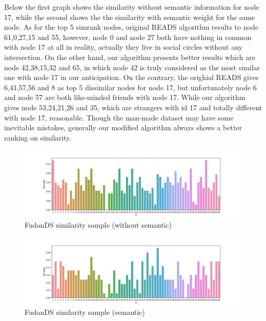 \documentclass[a4paper, 12pt]{article} %
\begin{document}
    Below the first graph shows the similarity without semantic information for node 17, while the second shows the the similarity with semantic weight for the same node. As for the top 5 simrank nodes, original READS algorithm results to node 61,0,27,15 and 55, however, node 0 and node 27 both have nothing in common with node 17 at all in reality, actually they live in social circles without any intersection. On the other hand, our algorithm presents better results which are node 42,38,15,32 and 65, in which node 42 is truly considered as the most similar one with node 17 in our anticipation. On the contrary, the orighial READS gives 6,41,57,56 and 8 as top 5 dissimilar nodes for node 17, but unfortunately node 6 and node 57 are both like-minded friends with node 17. While our algorithm gives node 53,24,21,26 and 35, which are strangers with id 17 and totally different with node 17, reasonable. Though the man-made dataset may have some inevitable mistakes, generally our modified algorithm always shows a better ranking on similarity. 
    
    \begin{figure}[H]
        \centering
        \includegraphics[width=\textwidth]{img/fudands-sample-1.png}
        \caption{FudanDS similarity sample (without semantic)}
    \end{figure}
    
    \begin{figure}[H]
        \centering
        \includegraphics[width=\textwidth]{img/fudands-sample-2.png}
        \caption{FudanDS similarity sample (semantic)}
    \end{figure}


\bigskip
\end{document}
